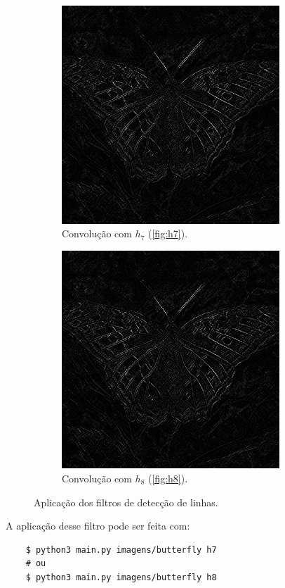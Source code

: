 \begin{figure}[H]
    \centering
    \begin{subfigure}{0.48\textwidth}
        \centering
        \includegraphics[width=0.9\textwidth]{resultados/butterfly_h7.png}
        \caption{Convolução com $h_7$ (\ref{fig:h7}).}
        \label{fig:linha:h7}
    \end{subfigure}%
    \begin{subfigure}{0.48\textwidth}
        \centering
        \includegraphics[width=0.9\textwidth]{resultados/butterfly_h8.png}
        \caption{Convolução com $h_8$ (\ref{fig:h8}).}
        \label{fig:linha:h8}
    \end{subfigure}

    \caption{Aplicação dos filtros de detecção de linhas.}
\end{figure}

A aplicação desse filtro pode ser feita com:

\begin{verbatim}
    $ python3 main.py imagens/butterfly h7
    # ou
    $ python3 main.py imagens/butterfly h8
\end{verbatim}
